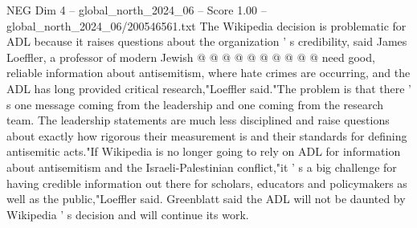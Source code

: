 \begin{textsample}{NEG Dim 4 – global\_north\_2024\_06 – Score 1.00 – global\_north\_2024\_06/200546561.txt}
The Wikipedia decision is problematic for ADL because it raises questions about the organization ' s credibility, said James Loeffler, a professor of modern Jewish @ @ @ @ @ @ @ @ @ @ need good, reliable information about antisemitism, where hate crimes are occurring, and the ADL has long provided critical research,"Loeffler said."The problem is that there ' s one message coming from the leadership and one coming from the research team.
The leadership statements are much less disciplined and raise questions about exactly how rigorous their measurement is and their standards for defining antisemitic acts."If Wikipedia is no longer going to rely on ADL for information about antisemitism and the Israeli-Palestinian conflict,"it ' s a big challenge for having credible information out there for scholars, educators and policymakers as well as the public,"Loeffler said.
Greenblatt said the ADL will not be daunted by Wikipedia ' s decision and will continue its work.

\end{textsample}
